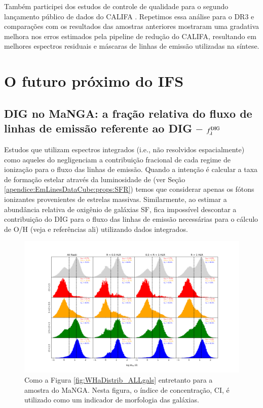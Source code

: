 Também participei dos estudos de controle de qualidade para o segundo lançamento público de dados do CALIFA  \citet[DR2; ][Apêndice \ref{apendice:GBetal2015a}]{GarciaBenito.etal.2015a}. Repetimos essa análise para o DR3 e comparações com os resultados das amostras anteriores mostraram uma gradativa melhora nos erros estimados pela pipeline de redução do CALIFA, resultando em melhores espectros residuais e máscaras de linhas de emissão utilizadas na síntese.


\section{O futuro próximo do IFS}
\label{sec:concl:futIFS}

\subsection{DIG no MaNGA: a fração relativa do fluxo de linhas de emissão referente ao DIG -- $f_\lambda^{\rm DIG}$}
\label{sec:concl:futIFS:DIGMaNGA}
Estudos que utilizam espectros integrados (i.e., não resolvidos espacialmente) como aqueles do \SDSS negligenciam a contribuição fracional de cada regime de ionização para o fluxo das linhas de emissão. Quando a intenção é calcular a taxa de formação estelar através da luminosidade de \Ha (ver Seção \ref{apendice:EmLinesDataCube:props:SFR}) temos que considerar apenas os fótons ionizantes provenientes de estrelas massivas. Similarmente, ao estimar a abundância relativa de oxigênio de galáxias SF, fica impossível descontar a contribuição do DIG para o fluxo das linhas de emissão necessárias para o cálculo de O/H (veja \citealt{Sanders.etal.2017a} e referências ali) utilizando dados integrados.

\begin{figure}
	\centering
	\includegraphics[scale=0.5]{figuras/fig_WHa_histo_per_CI_and_R_cumulFHa_MaNGA.png}
	\caption[MaNGA: Histogramas de $W_{{\rm H}\alpha}$]
	{Como a Figura \ref{fig:WHaDistrib_ALLgals} entretanto para a amostra do MaNGA. Nesta figura, o índice de concentração, CI, é utilizado como um indicador de morfologia das galáxias.}
	\label{fig:WHaDistrib_ALLgals_MaNGA}
\end{figure}

